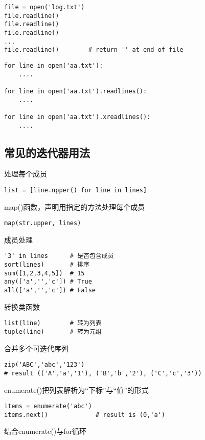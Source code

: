 \begin{lstlisting}
file = open('log.txt')
file.readline()
file.readline()
file.readline()
...
file.readline()        # return '' at end of file
\end{lstlisting}

\begin{lstlisting}
for line in open('aa.txt'):
	....

for line in open('aa.txt').readlines():
	....

for line in open('aa.txt').xreadlines():
	....
\end{lstlisting}

\subsection{常见的迭代器用法}

处理每个成员
\begin{lstlisting}
list = [line.upper() for line in lines]
\end{lstlisting}

map()函数，声明用指定的方法处理每个成员

\begin{lstlisting}
map(str.upper, lines)         
\end{lstlisting}

成员处理

\begin{lstlisting}
'3' in lines      # 是否包含成员
sort(lines)       # 排序
sum([1,2,3,4,5])  # 15
any(['a','','c']) # True
all(['a','','c']) # False
\end{lstlisting}

转换类函数

\begin{lstlisting}
list(line)        # 转为列表
tuple(line)       # 转为元组
\end{lstlisting}

合并多个可迭代序列

\begin{lstlisting}
zip('ABC','abc','123') 
# result (('A','a','1'), ('B','b','2'), ('C','c','3'))
\end{lstlisting}

enumerate()把列表解析为“下标”与“值”的形式

\begin{lstlisting}
items = enumerate('abc')
items.next()             # result is (0,'a')
\end{lstlisting}

结合enumerate()与for循环

